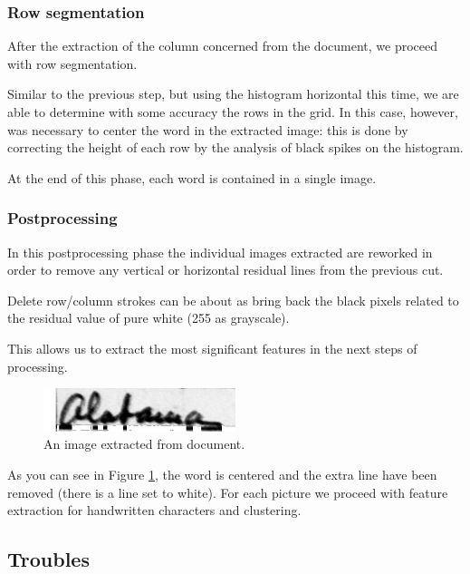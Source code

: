 \subsubsection{Row segmentation}

After the extraction of the column concerned from the document, we proceed with row segmentation.

Similar to the previous step, but using the histogram horizontal this time, we are able to determine with some accuracy the rows in the grid. In this case, however, was necessary to center the word in the extracted image: this is done by correcting the height of each row by the analysis of black spikes on the histogram.

At the end of this phase, each word is contained in a single image.

\subsubsection{Postprocessing}

In this postprocessing phase the individual images extracted are reworked in order to remove any  vertical or horizontal residual lines from the previous cut.

Delete row/column strokes can be about as bring back the black pixels related to the residual value of pure white (255 as grayscale).

This allows us to extract the most significant features in the next steps of processing.

\begin{figure}[!ht]
\centering
\vspace{0.3cm}
\includegraphics[width=0.5\textwidth]{images/img2.jpg}
\caption{An image extracted from document.}
\label{fig:extracted_image}
\end{figure}

As you can see in Figure \ref{fig:extracted_image}, the word is centered and the extra line have been removed (there is a line set to white). For each picture we proceed with feature extraction for handwritten characters and clustering. 

\subsection{Troubles}

